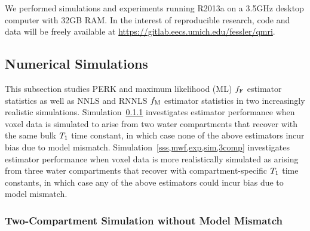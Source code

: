 We performed simulations and experiments
running \matlab R2013a 
on a 3.5GHz desktop computer with 32GB RAM.
In the interest of reproducible research,
code and data will be freely available
at \url{https://gitlab.eecs.umich.edu/fessler/qmri}.

\subsection{Numerical Simulations}
\label{ss,mwf,exp,sim}

This subsection studies
PERK and maximum likelihood (ML) $f_{\mathrm{F}}$ estimator statistics
as well as 
NNLS and RNNLS $f_\mathrm{M}$ estimator statistics 
in two increasingly realistic simulations.
Simulation~\ref{sss,mwf,exp,sim,2comp}
investigates estimator performance
when voxel data is simulated 
to arise from two water compartments
that recover with the same bulk $T_1$ time constant,
in which case none of the above estimators
incur bias due to model mismatch.
Simulation~\ref{sss,mwf,exp,sim,3comp}
investigates estimator performance
when voxel data is more realistically simulated
as arising from three water compartments
that recover with compartment-specific $T_1$ time constants,
in which case any of the above estimators
could incur bias due to model mismatch.

\subsubsection{Two-Compartment Simulation without Model Mismatch}
\label{sss,mwf,exp,sim,2comp}

